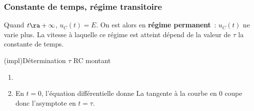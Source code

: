 \documentclass[../../main/main.tex]{subfiles}
\begin{document}
\subsubsection{Constante de temps, régime transitoire}
Quand $t \ra +\infty$, $u_C(t) = E$. On est alors en \textbf{régime permanent}~:
$u_C(t)$ ne varie plus. La vitesse à laquelle ce régime est atteint dépend de la
valeur de $\tau$ la constante de temps.
\begin{tcb*}[label=impl:déterm, sidebyside, righthand ratio=.4]
	(impl){Détermination $\tau$ RC montant}
	\begin{enumerate}
		\item {}%
		\item En $t=0$, l'équation différentielle donne
		      La tangente à la courbe en 0 coupe donc l'asymptote en $\boxed{t =
				      \tau}$.
	\end{enumerate}
	\tcblower
\end{tcb*}
\end{document}
